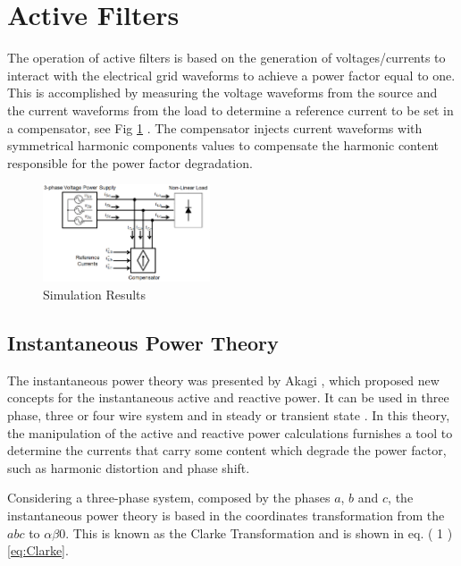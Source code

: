 \section{Active Filters}

The operation of active filters is based on the generation of voltages/currents to interact with the electrical grid waveforms to achieve a power factor equal to one. This is accomplished by measuring the voltage waveforms from the source and the current waveforms from the load to determine a reference current to be set in a compensator, see Fig \ref{fig:compensador.png} \cite{Akagi2006}. The compensator injects current waveforms with symmetrical harmonic components values to compensate the harmonic content responsible for the power factor degradation.

\begin{figure}[!h]
\centering
\includegraphics[width=0.44\textwidth]{Figures/compensador.png}
\caption{Simulation Results}
\label{fig:compensador.png}
\end{figure}



\subsection{Instantaneous Power Theory}

The instantaneous power theory was presented by Akagi \cite{Akagi1984}, which proposed new concepts for the instantaneous active and reactive power. It can be used in three phase, three or four wire system and in steady or transient state \cite{Akagi2007}. In this theory, the manipulation of the active and reactive power calculations furnishes a tool to determine the currents that carry some content which degrade the power factor, such as harmonic distortion and phase shift.

Considering a three-phase system, composed by the phases $a$, $b$ and $c$, the instantaneous power theory is based in the coordinates transformation from the $abc$ to $\alpha \beta 0 $. This is known as the Clarke Transformation and is shown in eq. ( 1 ) \ref{eq:Clarke}.



